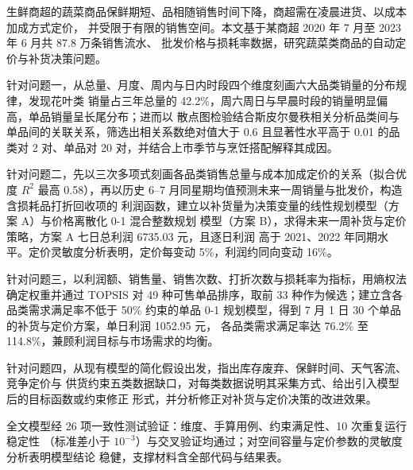 
生鲜商超的蔬菜商品保鲜期短、品相随销售时间下降，商超需在凌晨进货、以成本加成方式定价，
并受限于有限的销售空间。本文基于某商超 2020 年 7 月至 2023 年 6 月共 87.8 万条销售流水、
批发价格与损耗率数据，研究蔬菜类商品的自动定价与补货决策问题。

针对问题一，从总量、月度、周内与日内时段四个维度刻画六大品类销量的分布规律，发现花叶类
销量占三年总量的 42.2\%，周六周日与早晨时段的销量明显偏高，单品销量呈长尾分布；进而以
散点图检验结合斯皮尔曼秩相关分析品类间与单品间的关联关系，筛选出相关系数绝对值大于 0.6
且显著性水平高于 0.01 的品类对 2 对、单品对 20 对，并结合上市季节与烹饪搭配解释其成因。

针对问题二，先以三次多项式刻画各品类销售总量与成本加成定价的关系（拟合优度 $R^2$ 最高
0.58），再以历史 6--7 月同星期均值预测未来一周销量与批发价，构造含损耗品打折回收项的
利润函数，建立以补货量为决策变量的线性规划模型（方案 A）与价格离散化 0-1 混合整数规划
模型（方案 B），求得未来一周补货与定价策略，方案 A 七日总利润 6735.03 元，且逐日利润
高于 2021、2022 年同期水平。定价灵敏度分析表明，定价每变动 5\%，利润约同向变动 16\%。

针对问题三，以利润额、销售量、销售次数、打折次数与损耗率为指标，用熵权法确定权重并通过
TOPSIS 对 49 种可售单品排序，取前 33 种作为候选；建立含各品类需求满足率不低于 50\%
约束的单品 0-1 规划模型，得到 7 月 1 日 30 个单品的补货与定价方案，单日利润 1052.95 元，
各品类需求满足率达 76.2\% 至 114.8\%，兼顾利润目标与市场需求的均衡。

针对问题四，从现有模型的简化假设出发，指出库存废弃、保鲜时间、天气客流、竞争定价与
供货约束五类数据缺口，对每类数据说明其采集方式、给出引入模型后的目标函数或约束修正
形式，并分析修正对补货与定价决策的改进效果。

全文模型经 26 项一致性测试验证：维度、手算用例、约束满足性、10 次重复运行稳定性
（标准差小于 $10^{-3}$）与交叉验证均通过；对空间容量与定价参数的灵敏度分析表明模型结论
稳健，支撑材料含全部代码与结果表。
